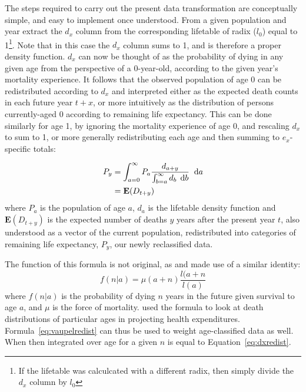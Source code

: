  \FloatBarrier

The steps required to carry out the present data transformation are conceptually
simple, and easy to implement once understood. From a given
population and year extract the $d_x$ column from the corresponding lifetable of
radix ($l_0$) equal to 1\footnote{If the lifetable was calculcated with a
different radix, then simply divide the $d_x$ column by $l_0$}. Note that in
this case the $d_x$ column sums to 1, and is therefore a proper density function. 
$d_x$ can now be thought of as the probability of dying in any given age from the
 perspective of a 0-year-old, according to the given year's mortality
 experience. It follows that the observed population of age 0 can be
 redistributed according to $d_x$ and interpreted either as the expected death
 counts in each future year
$t+x$, or more intuitively as the distribution of persons currently-aged 0 according 
to remaining life expectancy. This can be done similarly for age 1, by ignoring the 
mortality experience of age 0, and rescaling $d_x$ to
sum to 1, or more generally redistributing each age and then summing to
$e_x$-specific totals:

\begin{align}
\label{eq:dxredist}
P_{y} &= \int _{a = 0} ^{\infty} P_a \frac{d_{a + y}}{\int _{b
= a} ^{\infty} d_b\, \; \mathrm{d} b} \;\; \mathrm{d} a
\\
&= \mathbf{E}(D_{t+y}) \notag
\end{align}
where $P_a$ is the population of age $a$, $d_a$ is the
lifetable density function and $\mathbf{E}(D_{t+y})$ is the expected number of
deaths $y$ years after the present year $t$, also understood as a vector of the
current population, redistributed into categories of remaining life expectancy,
$P_{y}$, our newly reclassified data.

The function of this formula is not original, as
\citet{miller2001increasing} and \citet{vaupel2009life} made use of a similar
identity:
\begin{equation}
\label{eq:vaupelredist}
f(n | a) = \mu (a+n) \frac{l(a+n}{l(a)}
\end{equation}
where $f(n | a) $ is the probability of dying $n$ years in the future given
survival to age $a$, and $\mu$ is the force of mortality.
\citet{miller2001increasing} used the formula to look at death distributions of
particular ages in projecting health expenditures.
Formula~\eqref{eq:vaupelredist} can thus be used to weight age-classified data
as well. When then integrated over age for a given $n$ is equal to
Equation~\eqref{eq:dxredist}.

